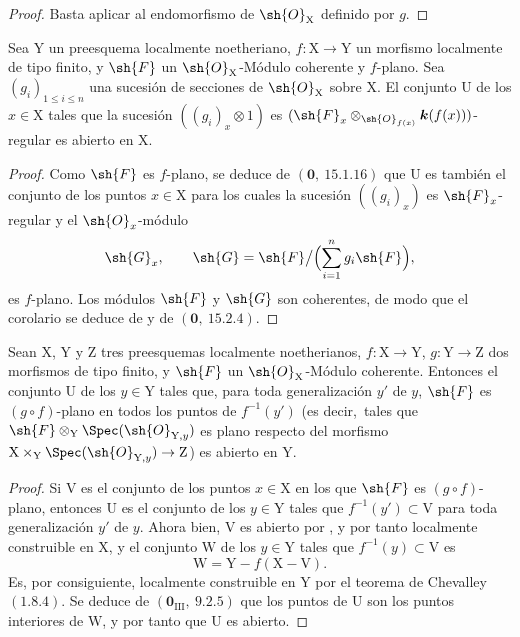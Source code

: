\begin{proof}
Basta aplicar  al endomorfismo de $\sh{O}_\mathrm{X}$ definido por $g$.
\end{proof}

\begin{corollary}[11.1.4]
\label{IV.11.1.4}
Sea $\mathrm{Y}$ un preesquema localmente noetheriano, $f:\mathrm{X}\to\mathrm{Y}$ un morfismo localmente de tipo finito, y $\sh{F}$ un $\sh{O}_\mathrm{X}$-Módulo coherente y $f$-plano. Sea $(g_i)_{1\leqslant i\leqslant n}$ una sucesión de secciones de $\sh{O}_\mathrm{X}$ sobre $\mathrm{X}$. El conjunto $\mathrm{U}$ de los $x\in\mathrm{X}$ tales que la sucesión $((g_i)_x\otimes 1)$ es $(\sh{F}_x\otimes_{\sh{O}_{f(x)}}\boldsymbol{k}(f(x)))$-regular es abierto en $\mathrm{X}$.
\end{corollary}

\begin{proof}
Como $\sh{F}$ es $f$-plano, se deduce de
$(\mathbf{0},~15.1.16)$ que $\mathrm{U}$ es también el conjunto de los puntos
$x\in\mathrm{X}$ para los cuales la sucesión $((g_i)_x)$ es
$\sh{F}_x$-regular y el $\sh{O}_x$-módulo
\[
  \sh{G}_x,\qquad
  \sh{G}=\sh{F}\big/\Bigl(\sum_{i=1}^n g_i\sh{F}\Bigr),
\]
es $f$-plano. Los módulos $\sh{F}$ y $\sh{G}$ son coherentes, de modo que el
corolario se deduce de  y de
$(\mathbf{0},~15.2.4)$.
\end{proof}

\begin{corollary}[11.1.5]
\label{IV.11.1.5}
Sean $\mathrm{X}$, $\mathrm{Y}$ y $\mathrm{Z}$ tres preesquemas localmente noetherianos, $f:\mathrm{X}\to\mathrm{Y}$, $g:\mathrm{Y}\to\mathrm{Z}$ dos morfismos de tipo finito, y $\sh{F}$ un $\sh{O}_\mathrm{X}$-Módulo coherente. Entonces el conjunto $\mathrm{U}$ de los $y\in\mathrm{Y}$ tales que, para toda generalización $y'$ de $y$, $\sh{F}$ es $(g\circ f)$-plano en todos los puntos de $f^{-1}(y')$ (es decir,\ tales que $\sh{F}\otimes_\mathrm{Y}\Spec(\sh{O}_{\mathrm{Y},y})$ es plano respecto del morfismo $\mathrm{X}\times_\mathrm{Y}\Spec(\sh{O}_{\mathrm{Y},y})\to\mathrm{Z}$) es abierto en $\mathrm{Y}$.
\end{corollary}

\begin{proof}
Si $\mathrm{V}$ es el conjunto de los puntos $x\in\mathrm{X}$ en los que $\sh{F}$ es
$(g\circ f)$-plano, entonces $\mathrm{U}$ es el conjunto de los $y\in\mathrm{Y}$ tales
que $f^{-1}(y')\subset\mathrm{V}$ para toda generalización $y'$ de $y$.
Ahora bien, $\mathrm{V}$ es abierto por , y por tanto localmente
construible en $\mathrm{X}$, y el conjunto $\mathrm{W}$ de los
$y\in\mathrm{Y}$ tales que $f^{-1}(y)\subset\mathrm{V}$ es
\[
  \mathrm{W}=\mathrm{Y}-f(\mathrm{X}-\mathrm{V}).
\]
Es, por consiguiente, localmente construible en $\mathrm{Y}$ por el teorema de
Chevalley $(1.8.4)$. Se deduce de
$(\mathbf{0}_{\mathrm{III}},~9.2.5)$ que los puntos de $\mathrm{U}$ son
los puntos interiores de $\mathrm{W}$, y por tanto que $\mathrm{U}$ es abierto.
\end{proof}

